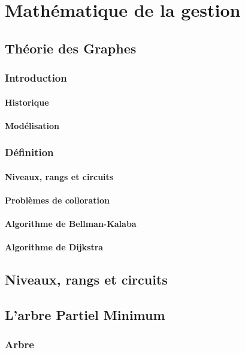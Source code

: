 \chapter{Mathématique de la gestion}\label{chap:mathdegestion}


\section{Théorie des Graphes}\label{sec:thgraphes}
\subsection{Introduction}
\subsubsection{Historique}
\subsubsection{Modélisation}
\subsection{Définition}
\subsubsection{Niveaux, rangs et circuits}
\subsubsection{Problèmes de colloration}
\subsubsection{Algorithme de Bellman-Kalaba}
\subsubsection{Algorithme de Dijkstra}

\newpage
\section{Niveaux, rangs et circuits}\label{sec:nrc}
\section{L'arbre Partiel Minimum}\label{sec:arbrepartielmini}
\subsection{Arbre}\label{subsec:arbre}
